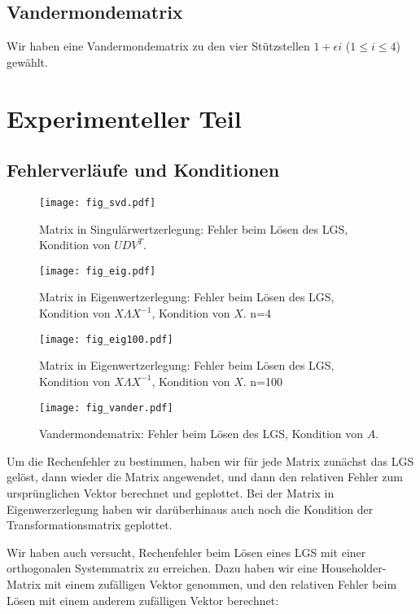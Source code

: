 \documentclass{scrartcl}
\begin{document}
\subsection{Vandermondematrix}

Wir haben eine Vandermondematrix zu den vier Stützstellen \(1 + \epsilon i\)
(\(1 \leq i \leq 4\)) gewählt.

\section{Experimenteller Teil}

\subsection{Fehlerverläufe und Konditionen}

\begin{figure}[!htb]
\centering
\texttt{[image: fig\_svd.pdf]}
\caption{Matrix in Singulärwertzerlegung: Fehler beim Lösen des LGS, Kondition von \(UDV^T\). }
\label{fig:svd}
\end{figure}

\begin{figure}[!htb]
\centering
\texttt{[image: fig\_eig.pdf]}
\caption{Matrix in Eigenwertzerlegung: Fehler beim Lösen des LGS, Kondition von \(X \Lambda X^{-1}\), Kondition von \(X\). n=4}
\label{fig:eig}
\end{figure}

\begin{figure}[!htb]
\centering
\texttt{[image: fig\_eig100.pdf]}
\caption{Matrix in Eigenwertzerlegung: Fehler beim Lösen des LGS, Kondition von \(X \Lambda X^{-1}\), Kondition von \(X\). n=100}
\label{fig:eig100}
\end{figure}

\begin{figure}[!htb]
\centering
\texttt{[image: fig\_vander.pdf]}
\caption{Vandermondematrix: Fehler beim Lösen des LGS, Kondition von \(A\). }
\label{fig:vander}
\end{figure}

Um die Rechenfehler zu bestimmen, haben wir für jede Matrix zunächst das LGS
gelöst, dann wieder die Matrix angewendet, und dann den relativen Fehler zum
ursprünglichen Vektor berechnet und geplottet.  Bei der Matrix in
Eigenwerzerlegung haben wir darüberhinaus auch noch die Kondition der
Transformationsmatrix geplottet.

Wir haben auch versucht, Rechenfehler beim Lösen eines LGS mit einer
orthogonalen Systemmatrix zu erreichen.  Dazu haben wir eine Householder-Matrix
mit einem zufälligen Vektor genommen, und den relativen Fehler beim Lösen mit
einem anderem zufälligen Vektor berechnet:
\end{document}

